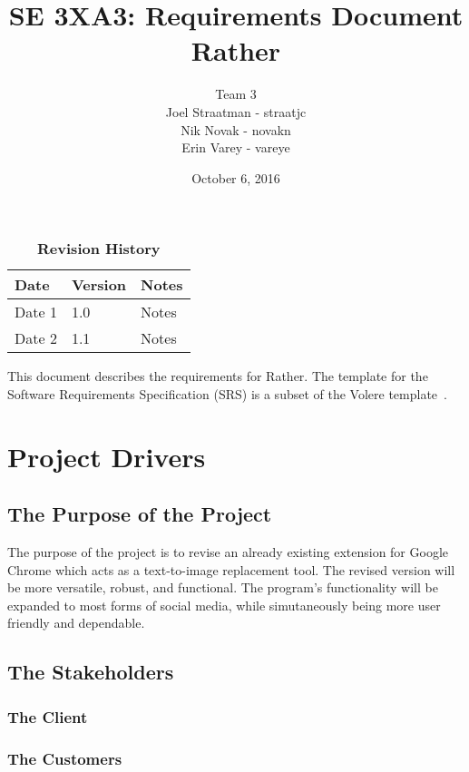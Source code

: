 \documentclass[12pt, titlepage]{article}
\title{SE 3XA3: Requirements Document\\Rather}
\author{Team 3
		\\ Joel Straatman - straatjc
		\\ Nik Novak - novakn
		\\ Erin Varey - vareye
}
\date{October 6, 2016}
\begin{document}
\maketitle

\tableofcontents
\listoftables
\listoffigures

\begin{table}[bp]
\caption{\bf Revision History}
\begin{tabularx}{\textwidth}{p{3cm}p{2cm}X}
\toprule {\bf Date} & {\bf Version} & {\bf Notes}\\
\midrule
Date 1 & 1.0 & Notes\\
Date 2 & 1.1 & Notes\\
\bottomrule
\end{tabularx}
\end{table}

\newpage


This document describes the requirements for Rather.  The template for the Software
Requirements Specification (SRS) is a subset of the Volere
template~\citep{RobertsonAndRobertson2012}.

\section{Project Drivers}

\subsection{The Purpose of the Project}

The purpose of the project is to revise an already existing extension for Google Chrome which acts as a text-to-image replacement tool. The revised version will be more versatile, robust, and functional. The program's functionality will be expanded to most forms of social media, while simutaneously being more user friendly and dependable. 

\subsection{The Stakeholders}

\subsubsection{The Client}

\subsubsection{The Customers}
\end{document}
